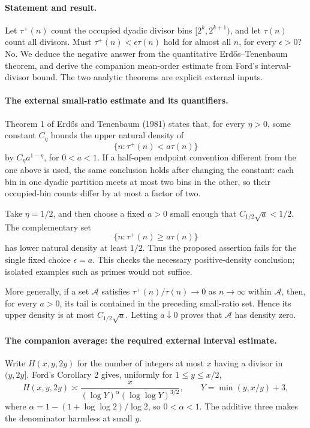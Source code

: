 \paragraph{Statement and result.}
Let \(\tau^+(n)\) count the occupied dyadic divisor bins
\([2^k,2^{k+1})\), and let \(\tau(n)\) count all divisors.
Must \(\tau^+(n)<\epsilon\tau(n)\) hold for almost all \(n\),
for every \(\epsilon>0\)?
No. We deduce the negative answer from the quantitative
Erd\H{o}s--Tenenbaum theorem, and derive the companion mean-order
estimate from Ford's interval-divisor bound. The two analytic
theorems are explicit external inputs.

\paragraph{The external small-ratio estimate and its quantifiers.}
Theorem 1 of Erd\H{o}s and Tenenbaum (1981) states that, for every
\(\eta>0\), some constant \(C_\eta\) bounds the upper natural density
of
\[
 \{n:\tau^+(n)<a\tau(n)\}
\]
by \(C_\eta a^{1-\eta}\), for \(0<a<1\).
If a half-open endpoint convention different from the one above is
used, the same conclusion holds after changing the constant: each
bin in one dyadic partition meets at most two bins in the other,
so their occupied-bin counts differ by at most a factor of two.

Take \(\eta=1/2\), and then choose a fixed \(a>0\) small enough that
\(C_{1/2}\sqrt a<1/2\). The complementary set
\[
 \{n:\tau^+(n)\geq a\tau(n)\}
 \tag{1}
\]
has lower natural density at least \(1/2\).
Thus the proposed assertion fails for the single fixed choice
\(\epsilon=a\). This checks the necessary positive-density conclusion;
isolated examples such as primes would not suffice.

More generally, if a set \(\mathcal A\) satisfies
\(\tau^+(n)/\tau(n)\to0\) as \(n\to\infty\) within \(\mathcal A\),
then, for every \(a>0\), its tail is contained in the preceding
small-ratio set. Hence its upper density is at most \(C_{1/2}\sqrt a\).
Letting \(a\downarrow0\) proves that \(\mathcal A\) has density zero.

\paragraph{The companion average: the required external interval estimate.}
Write \(H(x,y,2y)\) for the number of integers at most \(x\)
having a divisor in \((y,2y]\).
Ford's Corollary 2 gives, uniformly for \(1\leq y\leq x/2\),
\[
 H(x,y,2y)\asymp
 \frac{x}{(\log Y)^\alpha(\log\log Y)^{3/2}},
 \qquad Y=\min(y,x/y)+3,
 \tag{2}
\]
where \(\alpha=1-(1+\log\log2)/\log2\), so \(0<\alpha<1\).
The additive three makes the denominator harmless at small \(y\).

